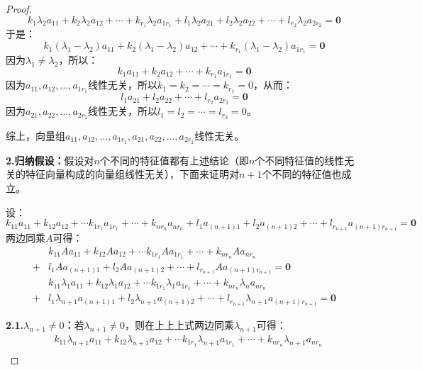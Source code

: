 \begin{proof}
	\begin{equation*}
		k_1\lambda_2a_{11}+k_2\lambda_2a_{12}+\cdots+k_{r_1}\lambda_2a_{1r_1}+l_1\lambda_2a_{21}+l_2\lambda_2a_{22}+\cdots+l_{r_2}\lambda_2a_{2r_2}=\mathbf{0}
	\end{equation*}
	于是：
	\begin{equation*}
		k_1(\lambda_1-\lambda_2)a_{11}+k_2(\lambda_1-\lambda_2)a_{12}+\cdots+k_{r_1}(\lambda_1-\lambda_2)a_{1r_1}=\mathbf{0}
	\end{equation*}
	因为$\lambda_1\ne\lambda_2$，所以：
	\begin{equation*}
		k_1a_{11}+k_2a_{12}+\cdots+k_{r_1}a_{1r_1}=\mathbf{0}
	\end{equation*}
	因为$a_{11},a_{12},\dots,a_{1r_1}$线性无关，所以$k_1=k_2=\cdots=k_{r_1}=0$，从而：
	\begin{equation*}
		l_1a_{21}+l_2a_{22}+\cdots+l_{r_2}a_{2r_2}=\mathbf{0}
	\end{equation*}
	因为$a_{21},a_{22},\dots,a_{2r_2}$线性无关，所以$l_1=l_2=\cdots=l_{r_2}=0$。\par
	综上，向量组$a_{11},a_{12},\dots,a_{1r_1},a_{21},a_{22},\dots,a_{2r_2}$线性无关。\par
	\textbf{2.归纳假设：}假设对$n$个不同的特征值都有上述结论（即$n$个不同特征值的线性无关的特征向量构成的向量组线性无关），下面来证明对$n+1$个不同的特征值也成立。\par
	设：
	\begin{equation*}
		k_{11}a_{11}+k_{12}a_{12}+\cdots k_{1r_1}a_{1r_1}+\cdots+k_{nr_n}a_{nr_n}+l_1a_{(n+1)1}+l_2a_{(n+1)2}+\cdots+l_{r_{n+1}}a_{(n+1)r_{n+1}}=\mathbf{0}
	\end{equation*}
	两边同乘$A$可得：
	\begin{align*}
		&k_{11}Aa_{11}+k_{12}Aa_{12}+\cdots k_{1r_1}Aa_{1r_1}+\cdots+k_{nr_n}Aa_{nr_n} \\
		+&l_1Aa_{(n+1)1}+l_2Aa_{(n+1)2}+\cdots+l_{r_{n+1}}Aa_{(n+1)r_{n+1}}=\mathbf{0} \\
		&k_{11}\lambda_1a_{11}+k_{12}\lambda_1a_{12}+\cdots k_{1r_1}\lambda_1a_{1r_1}+\cdots+k_{nr_n}\lambda_na_{nr_n} \\
		+&l_1\lambda_{n+1}a_{(n+1)1}+l_2\lambda_{n+1}a_{(n+1)2}+\cdots+l_{r_{n+1}}\lambda_{n+1}a_{(n+1)r_{n+1}}=\mathbf{0}
	\end{align*}\par
	\textbf{2.1.$\lambda_{n+1}\ne0$：}若$\lambda_{n+1}\ne0$，则在上上上式两边同乘$\lambda_{n+1}$可得：
	\begin{align*}
		&k_{11}\lambda_{n+1}a_{11}+k_{12}\lambda_{n+1}a_{12}+\cdots k_{1r_1}\lambda_{n+1}a_{1r_1}+\cdots+k_{nr_n}\lambda_{n+1}a_{nr_n} \\

\end{align*}
\end{proof}
